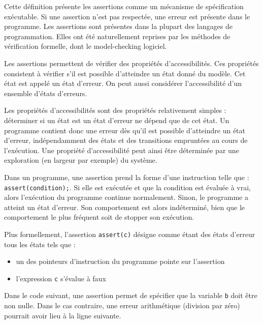 


Cette définition présente les assertions comme un mécanisme de spécification
exécutable. Si une assertion n'est pas respectée, une erreur est présente dans
le programme. Les assertions sont présentes dans la plupart des langages de
programmation. Elles ont été naturellement reprises par les méthodes de
vérification formelle, dont le model-checking logiciel.

Les assertions permettent de vérifier des propriétés d'accessibilités. Ces
propriétés consistent à vérifier s’il est possible d'atteindre un état donné du
modèle. Cet état est appelé un état d'erreur. On peut aussi considérer
l'accessibilité d'un ensemble d'états d'erreurs.

Les propriétés d'accessibilités sont des propriétés relativement simples :
déterminer si un état est un état d'erreur ne dépend que de cet état. Un
programme contient donc une erreur dès qu'il est possible d'atteindre un état
d'erreur, indépendamment des états et des transitions empruntées au cours de
l'exécution. Une propriété d'accessibilité peut ainsi être déterminée par une
exploration (en largeur par exemple) du système.

Dans un programme, une assertion prend la forme d'une instruction telle que :
\texttt{assert(condition);}.
Si elle est exécutée et que la condition est évaluée à vrai, alors l'exécution
du programme continue normalement.
Sinon, le programme a atteint un état d'erreur. Son comportement est alors
indéterminé, bien que le comportement le plus fréquent soit de stopper son
exécution.

Plus formellement, l'assertion \texttt{assert(c)} désigne comme étant des
états d'erreur tous les états tels que :

\begin{itemize}
\item
  un des pointeurs d'instruction du programme pointe sur l'assertion
\item
  l'expression \texttt{c} s'évalue à faux
\end{itemize}

Dans le code suivant, une assertion permet de spécifier que la variable
\texttt{b} doit être non nulle. Dans le cas contraire, une erreur
arithmétique (division par zéro) pourrait avoir lieu à la ligne suivante.

